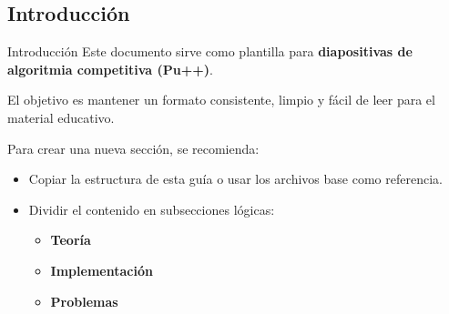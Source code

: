 \subsection{Introducción}

\begin{frame}{Introducción}
    Este documento sirve como plantilla para \textbf{diapositivas de algoritmia
    competitiva (Pu++)}. 

    El objetivo es mantener un formato consistente, limpio y fácil de leer para
    el material educativo.

    \vspace{0.5cm}

    Para crear una nueva sección, se recomienda:
    \begin{itemize}
        \item Copiar la estructura de esta guía o usar los archivos base como referencia.
        \item Dividir el contenido en subsecciones lógicas:
        \begin{itemize}
            \item \textbf{Teoría}
            \item \textbf{Implementación}
            \item \textbf{Problemas}
        \end{itemize}
    \end{itemize}
\end{frame}


